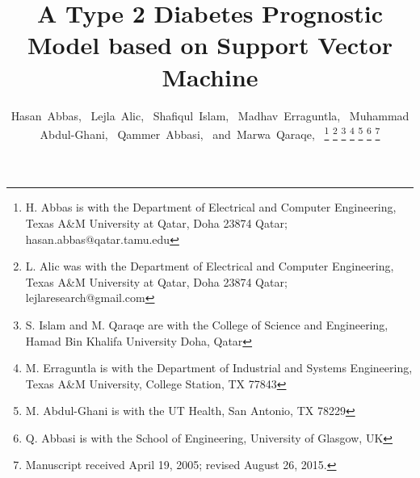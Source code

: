\documentclass[journal,comsoc]{IEEEtran}
\renewcommand{\^}{\hat}  %
\begin{document}
%
\title{A Type 2 Diabetes Prognostic Model based on Support Vector Machine}
%
%

\author{Hasan~Abbas,~
Lejla~Alic,~
Shafiqul~Islam,~
Madhav~Erraguntla,~
Muhammad Abdul-Ghani,~
Qammer~Abbasi,~
and~Marwa~Qaraqe,~%
\thanks{H. Abbas is with the Department
of Electrical and Computer Engineering, Texas A\&M University at Qatar, Doha 23874 Qatar;  hasan.abbas@qatar.tamu.edu}%
\thanks{L. Alic was with the Department
of Electrical and Computer Engineering, Texas A\&M University at Qatar, Doha 23874 Qatar; lejlaresearch@gmail.com}%
\thanks{S. Islam and M. Qaraqe are with the College of Science and Engineering, Hamad Bin Khalifa University Doha, Qatar}%
\thanks{M. Erraguntla is with the Department of Industrial and Systems Engineering, Texas A\&M University, College Station, TX 77843}%
\thanks{M. Abdul-Ghani is with the UT Health, San Antonio, TX 78229}%
\thanks{Q. Abbasi is with the School of Engineering, University of Glasgow, UK}%
\thanks{Manuscript received April 19, 2005; revised August 26, 2015.}}

%
%
\end{document}
